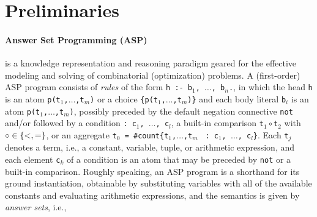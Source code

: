 \documentclass{tlp} %
\begin{document}
\section{Preliminaries}\label{sec:preliminaries}

\paragraph{Answer Set Programming (ASP)} \citep{lifschitz19a}
is a knowledge representation and reasoning paradigm geared for the effective 
modeling and solving of combinatorial (optimization) problems. %
A (first-order) ASP program consists of \emph{rules} of the form
\lstinline{h :- b}$_1$\lstinline{, }$\dots$\lstinline{, b}$_n$\lstinline{.},
in which the head \lstinline{h} is an atom
\lstinline{p(t}$_1$\lstinline{,}$\dots$\lstinline{,t}$_m$\lstinline{)} or a
choice
\lstinline{{p(t}$_1$\lstinline{,}$\dots$\lstinline{,t}$_m$\lstinline|)}|
and each body literal \lstinline{b}$_i$ is an atom
\lstinline{p(t}$_1$\lstinline{,}$\dots$\lstinline{,t}$_m$\lstinline{)},
possibly preceded by the default negation connective \lstinline{not} and/or
followed by a condition
\lstinline|: c|$_1$\lstinline{, }$\dots$\lstinline{, c}$_l$, 
a built-in comparison \lstinline{t}$_1\circ{}$\lstinline{t}$_2$
with $\circ\in\{\text{\lstinline{<}},\text{\lstinline{=}}\}$,
or an aggregate
\lstinline|t|$_0$\lstinline| = #count{t|$_1$\lstinline{,}$\dots$\lstinline{,t}$_m$%
\lstinline| : c|$_1$\lstinline{, }$\dots$\lstinline{, c}$_l$\lstinline|}|.
Each \lstinline|t|$_j$ denotes a term, i.e., a constant, variable, tuple,
or arithmetic expression, and each element \lstinline|c|$_k$ of a condition is
an atom that may be preceded by \lstinline{not} or a built-in comparison.
Roughly speaking, an ASP program is a shorthand for its ground instantiation,
obtainable by substituting variables with all of the available constants
and evaluating arithmetic expressions,
and the semantics is given by \emph{answer sets}, i.e.,
\end{document}
